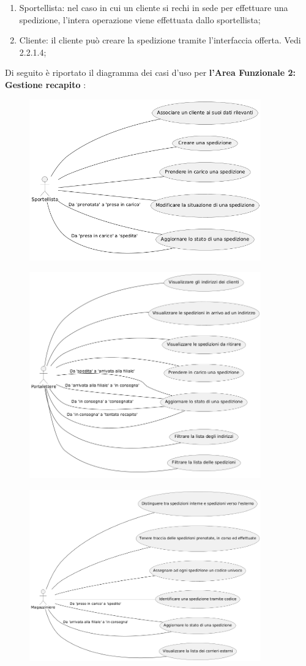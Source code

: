 \begin{enumerate}
  \item{Sportellista}: nel caso in cui un cliente si rechi in sede per effettuare una spedizione, l'intera operazione viene effettuata dallo sportellista;
  \item{Cliente}: il cliente può creare la spedizione tramite l'interfaccia offerta. Vedi 2.2.1.4;

\end{enumerate}
Di seguito è riportato il diagramma dei casi d'uso per \textbf{l'Area Funzionale 2: Gestione recapito} :
\begin{figure}[H]
  \centering
  \includegraphics[width=10cm]{assets/usecase_recapito_1.png}
\end{figure}
\begin{figure}[H]
  \centering
  \includegraphics[width=10cm]{assets/usecase_recapito_2.png}
\end{figure}
\begin{figure}[H]
  \centering
  \includegraphics[width=10cm]{assets/usecase_recapito_3.png}
\end{figure}
